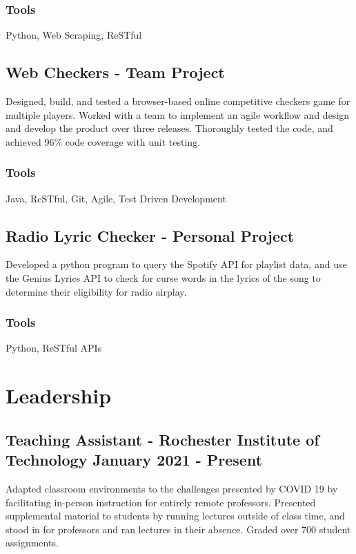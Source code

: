 \documentclass[11pt, letterpaper]{article}
\begin{document}
            \subsubsection{Tools}
                Python, Web Scraping, ReSTful

        \subsection{Web Checkers - Team Project}
            Designed, build, and tested a browser-based online competitive checkers game for multiple players. 
            Worked with a team to implement an agile workflow and design and develop the product over three 
            releases. Thoroughly tested the code, and achieved 96\% code coverage with unit testing.
            \subsubsection{Tools}
                Java, ReSTful, Git, Agile, Test Driven Development

        \subsection{Radio Lyric Checker - Personal Project}
            Developed a python program to query the Spotify API for playlist data, and use the Genius Lyrics
            API to check for curse words in the lyrics of the song to determine their eligibility for radio
            airplay. 
            \subsubsection{Tools}
                Python, ReSTful APIs

    \section{Leadership}
        \subsection{Teaching Assistant - Rochester Institute of Technology \hfill January 2021 - Present}
            Adapted classroom environments to the challenges presented by COVID 19 by facilitating in-person
            instruction for entirely remote professors. Presented supplemental material to students by running 
            lectures outside of class time, and stood in for professors and ran lectures in their absence. 
            Graded over 700 student assignments.
\end{document}
